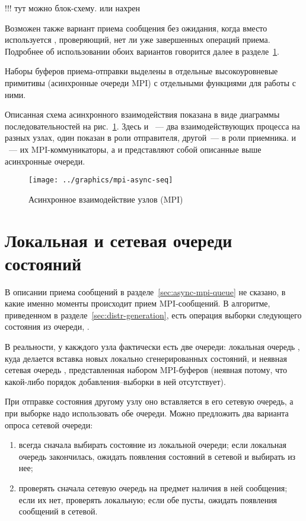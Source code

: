 !!! тут можно блок-схему. или нахрен

Возможен также вариант приема сообщения без ожидания, когда вместо 
используется , проверяющий, нет ли уже завершенных операций
приема. Подробнее об использовании обоих вариантов говорится далее в
разделе~\ref{sec:local-network-queue}.

Наборы буферов приема-отправки выделены в отдельные высокоуровневые примитивы (асинхронные
очереди MPI) с отдельными функциями для работы с ними.

Описанная схема асинхронного взаимодействия показана в виде диаграммы последовательностей
на рис.~\ref{fig:mpi-async-seq}. Здесь  и ~--- два взаимодействующих
процесса на разных узлах, один показан в роли отправителя, другой~--- в роли
приемника.  и ~--- их MPI-коммуникаторы, а  и 
представляют собой описанные выше асинхронные очереди.

\begin{figure}[ht]
  \centering
  \texttt{[image: ../graphics/mpi-async-seq]}  
  \caption{Асинхронное взаимодействие узлов (MPI)}
  \label{fig:mpi-async-seq}
\end{figure}

\section{Локальная и сетевая очереди состояний}
\label{sec:local-network-queue}

В описании приема сообщений в разделе~\ref{sec:async-mpi-queue} не сказано, в какие именно
моменты происходит прием MPI-сообщений. В алгоритме, приведенном в
разделе~\ref{sec:distr-generation}, есть операция выборки следующего состояния из очереди,
.

В реальности, у какждого узла фактически есть две очереди: локальная очередь
, куда делается вставка новых локально сгенерированных состояний, и
неявная сетевая очередь , представленная набором MPI-буферов (неявная
потому, что какой-либо порядок добавления--выборки в ней отсутствует).

При отправке состояния другому узлу оно вставляется в его сетевую очередь, а при выборке
надо использовать обе очереди. Можно предложить два варианта опроса сетевой очереди:
\begin{enumerate}
\item всегда сначала выбирать состояние из локальной очереди; если локальная очередь
  закончилась, ожидать появления состояний в сетевой и выбирать из нее;
\item проверять сначала сетевую очередь на предмет наличия в ней сообщения; если их нет,
  проверять локальную; если обе пусты, ожидать появления сообщений в сетевой.
\end{enumerate}

